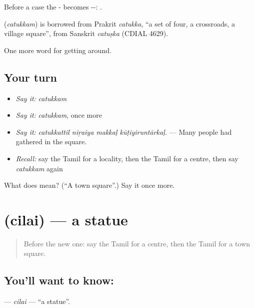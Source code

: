 Before a case the - becomes --: .

\begin{cousinweb}
\textbf{} (\emph{catukkam}) is borrowed from Prakrit \emph{catukka}, \textquotedblleft{}a set of four, a crossroads, a village square\textquotedblright{}, from Sanskrit \emph{catuṣka} (CDIAL 4629).
\end{cousinweb}

\begin{grammarlens}[title={What you've built}]
One more word for getting around.
\end{grammarlens}

\subsection*{Your turn}
\begin{itemize}
\raggedright
  \item \emph{Say it:} \emph{catukkam}
  \item \emph{Say it:} \emph{catukkam}, once more
  \item \emph{Say it:} \emph{catukkattil niṟaiya makkaḷ kūṭiyiruntārkaḷ.} — Many people had gathered in the square.
  \item \emph{Recall:} say the Tamil for a locality, then the Tamil for a centre, then say \emph{catukkam} again
\end{itemize}

\begin{tcolorbox}[breakable,colback=teal!4,colframe=teal!35!black,title={Before you move on}]
What does  mean? (\textquotedblleft{}A town square\textquotedblright{}.) Say it once more.
\end{tcolorbox}
\section[\texorpdfstring{\ta{சிலை} (cilai)}{சிலை (cilai)}]{ (cilai) — a statue}

\label{lesson:TA-C424-cilai}



\begin{quote}
Before the new one: say the Tamil for a centre, then the Tamil for a town square.
\end{quote}

\subsection*{You'll want to know: }
\textbf{} — \emph{cilai} — \textquotedblleft{}a statue\textquotedblright{}.

